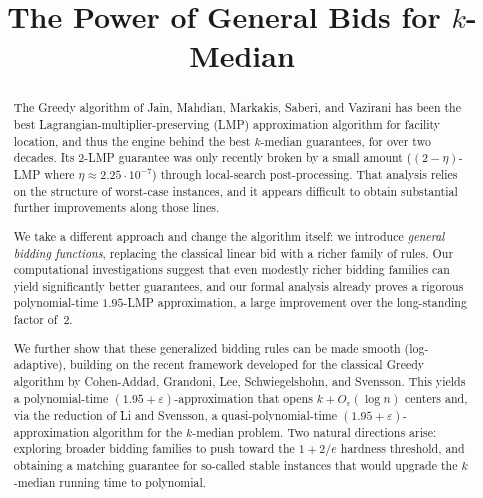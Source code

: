 \documentclass{article}
\title{The Power of General Bids for $k$-Median}
\author{}
\date{}
\begin{document}

\maketitle


\newcommand{\pos}[1]{\left[#1\right]^+} %
\newcommand{\Ball}[2]{B(#1,#2)}         %
\newcommand{\dist}{d}                   %



\begin{abstract}
The Greedy algorithm of Jain, Mahdian, Markakis, Saberi, and Vazirani has been the best Lagrangian-multiplier-preserving (LMP) approximation algorithm for facility location, and thus the engine behind the best $k$-median guarantees, for over two decades. Its $2$-LMP guarantee was only recently broken by a small amount ($(2-\eta)$-LMP where $\eta \approx 2.25 \cdot 10^{-7}$) through local-search post-processing. That analysis relies on the structure of worst-case instances, and it appears difficult to obtain substantial further improvements along those lines.

We take a different approach and change the algorithm itself: we introduce \emph{general bidding functions}, replacing the classical linear bid with a richer family of rules. Our computational investigations suggest that even modestly richer bidding families can yield significantly better guarantees, and our formal analysis already proves a rigorous polynomial-time $1.95$-LMP approximation, a large improvement over the long-standing factor of~$2$.

We further show that these generalized bidding rules can be made smooth (log-adaptive), building on the recent framework developed for the classical Greedy algorithm by Cohen-Addad, Grandoni, Lee, Schwiegelshohn, and Svensson. This yields a polynomial-time $(1.95+\varepsilon)$-approximation that opens $k+O_\varepsilon(\log n)$ centers and, via the reduction of Li and Svensson, a quasi-polynomial-time $(1.95+\varepsilon)$-approximation algorithm for the $k$-median problem. Two natural directions arise: exploring broader bidding families to push toward the $1+2/e$ hardness threshold, and obtaining a matching guarantee for so-called stable instances that would upgrade the $k$-median running time to polynomial.
\end{abstract}
\end{document}
